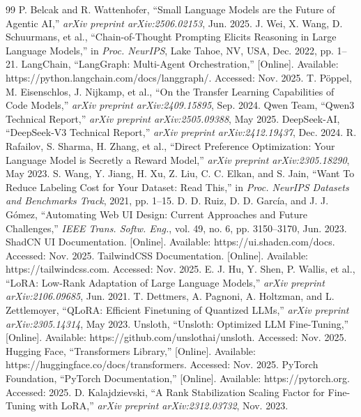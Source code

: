 \documentclass[conference]{IEEEtran}
\begin{document}
\begin{thebibliography}{99}
 P. Belcak and R. Wattenhofer, ``Small Language Models are the Future of Agentic AI,'' \textit{arXiv preprint arXiv:2506.02153}, Jun. 2025.
 J. Wei, X. Wang, D. Schuurmans, et al., ``Chain-of-Thought Prompting Elicits Reasoning in Large Language Models,'' in \textit{Proc. NeurIPS}, Lake Tahoe, NV, USA, Dec. 2022, pp. 1–21.
 LangChain, ``LangGraph: Multi-Agent Orchestration,'' [Online]. Available: https://python.langchain.com/docs/langgraph/. Accessed: Nov. 2025.
 T. Pöppel, M. Eisenschlos, J. Nijkamp, et al., ``On the Transfer Learning Capabilities of Code Models,'' \textit{arXiv preprint arXiv:2409.15895}, Sep. 2024.
 Qwen Team, ``Qwen3 Technical Report,'' \textit{arXiv preprint arXiv:2505.09388}, May 2025.
 DeepSeek-AI, ``DeepSeek-V3 Technical Report,'' \textit{arXiv preprint arXiv:2412.19437}, Dec. 2024.
 R. Rafailov, S. Sharma, H. Zhang, et al., ``Direct Preference Optimization: Your Language Model is Secretly a Reward Model,'' \textit{arXiv preprint arXiv:2305.18290}, May 2023.
 S. Wang, Y. Jiang, H. Xu, Z. Liu, C. C. Elkan, and S. Jain, ``Want To Reduce Labeling Cost for Your Dataset: Read This,'' in \textit{Proc. NeurIPS Datasets and Benchmarks Track}, 2021, pp. 1–15.
 D. D. Ruiz, D. D. García, and J. J. Gómez, ``Automating Web UI Design: Current Approaches and Future Challenges,'' \textit{IEEE Trans. Softw. Eng.}, vol. 49, no. 6, pp. 3150–3170, Jun. 2023.
 ShadCN UI Documentation. [Online]. Available: https://ui.shadcn.com/docs. Accessed: Nov. 2025.
 TailwindCSS Documentation. [Online]. Available: https://tailwindcss.com. Accessed: Nov. 2025.
 E. J. Hu, Y. Shen, P. Wallis, et al., ``LoRA: Low-Rank Adaptation of Large Language Models,'' \textit{arXiv preprint arXiv:2106.09685}, Jun. 2021.
 T. Dettmers, A. Pagnoni, A. Holtzman, and L. Zettlemoyer, ``QLoRA: Efficient Finetuning of Quantized LLMs,'' \textit{arXiv preprint arXiv:2305.14314}, May 2023.
 Unsloth, ``Unsloth: Optimized LLM Fine-Tuning,'' [Online]. Available: https://github.com/unslothai/unsloth. Accessed: Nov. 2025.
 Hugging Face, ``Transformers Library,'' [Online]. Available: https://huggingface.co/docs/transformers. Accessed: Nov. 2025.
 PyTorch Foundation, ``PyTorch Documentation,'' [Online]. Available: https://pytorch.org. Accessed: 2025.
 D. Kalajdzievski, ``A Rank Stabilization Scaling Factor for Fine-Tuning with LoRA,'' \textit{arXiv preprint arXiv:2312.03732}, Nov. 2023.
\end{thebibliography}
\end{document}
